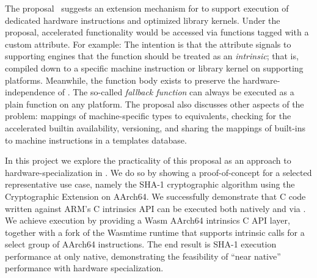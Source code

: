 The  proposal~\cite{hw-spec-wasm} suggests an extension
mechanism for \wasm to support execution of dedicated hardware instructions and
optimized library kernels. Under the proposal, accelerated functionality would
be accessed via functions tagged with a custom  attribute. For
example: 
%
%
The intention is that the attribute signals to supporting engines that the
function should be treated as an \emph{intrinsic}; that is, compiled down to a
specific machine instruction or library kernel on supporting platforms.
Meanwhile, the function body exists to preserve the hardware-independence of
\wasm. The so-called \emph{fallback function} can always be executed as a plain
\wasm function on any platform. The proposal also discusses other aspects of the
problem: mappings of machine-specific types to \wasm equivalents, checking for
the accelerated builtin availability, versioning, and sharing the mappings of
built-ins to machine instructions in a templates database.


In this project we explore the practicality of this proposal as an approach to
hardware-specialization in \wasm. We do so by showing a proof-of-concept for a
selected representative use case, namely the SHA-1 cryptographic algorithm using
the Cryptographic Extension on AArch64. We successfully demonstrate that C code
written against ARM's C intrinsics API can be executed both natively and via
\wasm. We achieve \wasm execution by providing a Wasm AArch64 intrinsics C API
layer, together with a fork of the Wasmtime \wasm runtime that supports
intrinsic calls for a select group of AArch64 instructions. The end result is
SHA-1 execution performance at only \MetricInlineWasmtimeHwwasmDivNative native,
demonstrating the feasibility of ``near native'' performance with hardware
specialization.
